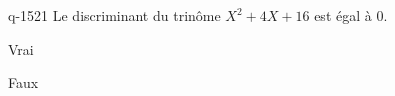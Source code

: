 \begin{truefalse}{q-1521}
Le discriminant du trinôme $X^2+4X+16$ est égal à $0$.
\item Vrai
\item* Faux
\end{truefalse}

